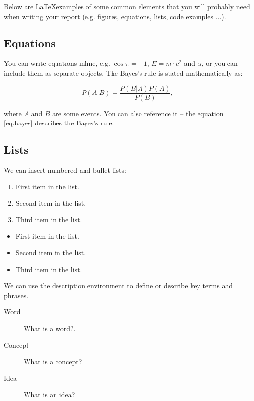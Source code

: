 \documentclass[fleqn,moreauthors,10pt]{ds_report}
\begin{document}
	Below are \LaTeX examples of some common elements that you will probably need when writing your report (e.g. figures, equations, lists, code examples ...).
	
	
	\subsection*{Equations}
	
	You can write equations inline, e.g. $\cos\pi=-1$, $E = m \cdot c^2$ and $\alpha$, or you can include them as separate objects. The Bayes’s rule is stated mathematically as:
	
	\begin{equation}
		P(A|B) = \frac{P(B|A)P(A)}{P(B)},
		\label{eq:bayes}
	\end{equation}
	
	where $A$ and $B$ are some events. You can also reference it -- the equation \ref{eq:bayes} describes the Bayes's rule.
	
	\subsection*{Lists}
	
	We can insert numbered and bullet lists:
	
	\begin{enumerate}[noitemsep] 
		\item First item in the list.
		\item Second item in the list.
		\item Third item in the list.
	\end{enumerate}
	
	\begin{itemize}[noitemsep] 
		\item First item in the list.
		\item Second item in the list.
		\item Third item in the list.
	\end{itemize}
	
	We can use the description environment to define or describe key terms and phrases.
	
	\begin{description}
		\item[Word] What is a word?.
		\item[Concept] What is a concept?
		\item[Idea] What is an idea?
	\end{description}
	
\end{document}
